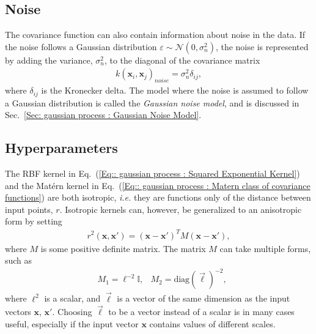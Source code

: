 \documentclass[twoside,english]{uiofysmaster}
\begin{document}
{\subsection{Noise}\label{Sec:: gaussian process : Noise Covariance Function}


The covariance function can also contain information about noise in the data. If the noise follows a Gaussian distribution $\varepsilon \sim \mathcal{N}(0, \sigma_n^2)$, the noise is represented by adding the variance, $\sigma_n^2$, to the diagonal of the covariance matrix
\begin{align}
k(\textbf{x}_i, \textbf{x}_j)_{noise} = \sigma^2_n \delta_{ij},
\end{align}
where $\delta_{ij}$ is the Kronecker delta. The model where the noise is assumed to follow a Gaussian distribution is called the \textit{Gaussian noise model}, and is discussed in Sec.~\ref{Sec: gaussian process : Gaussian Noise Model}. %

\subsection{Hyperparameters}\label{Sec:: gaussian process : Hyperparameters}

The RBF kernel in Eq.~(\ref{Eq:: gaussian process : Squared Exponential Kernel}) and the Mat\'{e}rn kernel in Eq.~(\ref{Eq:: gaussian process : Matern class of covariance functions}) are both isotropic, \textit{i.e.} they are functions only of the distance between input points, $r$. Isotropic kernels can, however, be generalized to an anisotropic form by setting
\begin{align}
r^2(\textbf{x}, \textbf{x}') = (\textbf{x} - \textbf{x}')^T M(\textbf{x} - \textbf{x}'),
\end{align}
where $M$ is some positive definite matrix. The matrix $M$ can take multiple forms, such as 
\begin{align}
&M_1 = \ell^{-2} \mathbb{I} , &M_2 = \text{diag}(\vec{\ell})^{-2},
\end{align}
where $\ell^2$ is a scalar, and $\vec{\ell}$ is a vector of the same dimension as the input vectors $\textbf{x}$, $\textbf{x}'$. Choosing $\vec{\ell}$ to be a vector instead of a scalar is in many cases useful, especially if the input vector $\textbf{x}$ contains values of different scales.

}
\end{document}
